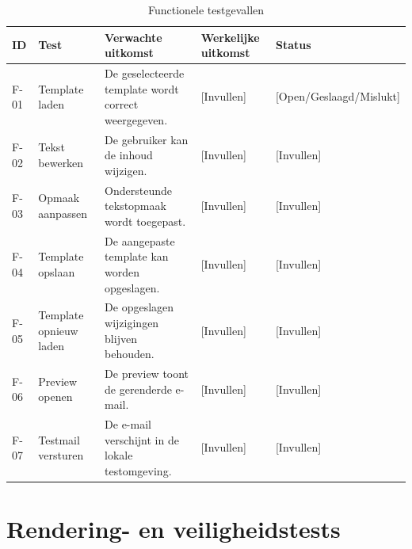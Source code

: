\begin{table}[htbp]
    \centering
    \caption{Functionele testgevallen}
    \label{tab:functionele-tests}
    \small
    \begin{tabular}{|p{1.2cm}|p{3cm}|p{4.2cm}|p{3cm}|p{1.5cm}|}
        \hline
        \textbf{ID} & \textbf{Test} & \textbf{Verwachte uitkomst} &
        \textbf{Werkelijke uitkomst} & \textbf{Status} \\
        \hline
        F-01 & Template laden &
        De geselecteerde template wordt correct weergegeven. &
        [Invullen] & [Open/Geslaagd/Mislukt] \\
        \hline
        F-02 & Tekst bewerken &
        De gebruiker kan de inhoud wijzigen. &
        [Invullen] & [Invullen] \\
        \hline
        F-03 & Opmaak aanpassen &
        Ondersteunde tekstopmaak wordt toegepast. &
        [Invullen] & [Invullen] \\
        \hline
        F-04 & Template opslaan &
        De aangepaste template kan worden opgeslagen. &
        [Invullen] & [Invullen] \\
        \hline
        F-05 & Template opnieuw laden &
        De opgeslagen wijzigingen blijven behouden. &
        [Invullen] & [Invullen] \\
        \hline
        F-06 & Preview openen &
        De preview toont de gerenderde e-mail. &
        [Invullen] & [Invullen] \\
        \hline
        F-07 & Testmail versturen &
        De e-mail verschijnt in de lokale testomgeving. &
        [Invullen] & [Invullen] \\
        \hline
    \end{tabular}
\end{table}

\section{Rendering- en veiligheidstests}


